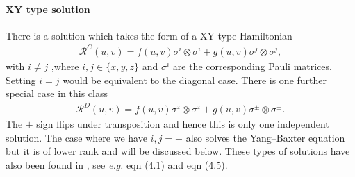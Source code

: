 \documentclass{article}
\begin{document}
\paragraph{XY type solution}
There is a solution which takes the form of a XY type Hamiltonian
%
\begin{align}
    \mathcal{R}^{C}(u,v)= f(u,v) \sigma^i \otimes \sigma^i + g(u,v) \sigma^j \otimes \sigma^j,
\end{align}
%
with $i\neq j$ ,where $i,j \in \{x,y,z\}$ and $\sigma^i$ are the corresponding Pauli matrices. Setting $i=j$ would be equivalent to the diagonal case. There is one further special case in this class
%
\begin{align}
    \mathcal{R}^{D}(u,v)= f(u,v) \sigma^z \otimes \sigma^z + g(u,v) \sigma^\pm \otimes \sigma^\pm.
\end{align}
%
The $\pm$ sign flips under transposition and hence this is only one independent solution. The case where we have $i,j = \pm$ also solves the Yang--Baxter equation but it is of lower rank and will be discussed below. These types of solutions have also been found in \cite{Padmanabhan:2024zma}, see \textit{e.g.}  eqn (4.1) and eqn (4.5).
\end{document}

